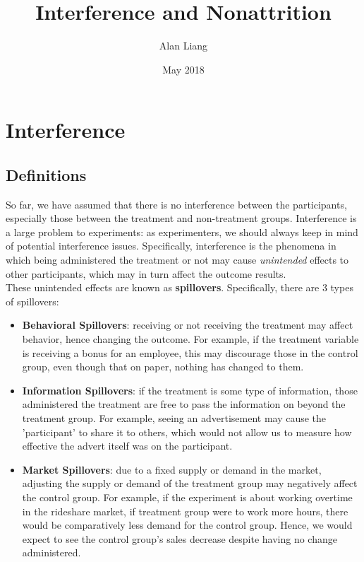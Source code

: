 \documentclass{article}
\title{Interference and Nonattrition}
\author{Alan Liang}
\date{May 2018}
\begin{document}
\maketitle

\section{Interference}
\subsection{Definitions}
So far, we have assumed that there is no interference between the participants, especially those between the treatment and non-treatment groups.
Interference is a large problem to experiments: as experimenters, we should always keep in mind of potential interference issues.
Specifically, interference is the phenomena in which being administered the treatment or not may cause \textit{unintended} effects to other participants, which may in turn affect the outcome results.
\\
These unintended effects are known as \textbf{spillovers}. 
Specifically, there are 3 types of spillovers:
\begin{itemize}
	\item \textbf{Behavioral Spillovers}: receiving or not receiving the treatment may affect behavior, hence changing the outcome. 
	For example, if the treatment variable is receiving a bonus for an employee, this may discourage those in the control group, even though that on paper, nothing has changed to them. 
	\item \textbf{Information Spillovers}: if the treatment is some type of information, those administered the treatment are free to pass the information on beyond the treatment group.
	For example, seeing an advertisement may cause the 'participant' to share it to others, which would not allow us to measure how effective the advert itself was on the participant. 
	\item \textbf{Market Spillovers}: due to a fixed supply or demand in the market, adjusting the supply or demand of the treatment group may negatively affect the control group.
	For example, if the experiment is about working overtime in the rideshare market, if treatment group were to work more hours, there would be comparatively less demand for the control group. 
	Hence, we would expect to see the control group's sales decrease despite having no change administered.
\end{itemize}
\end{document}

